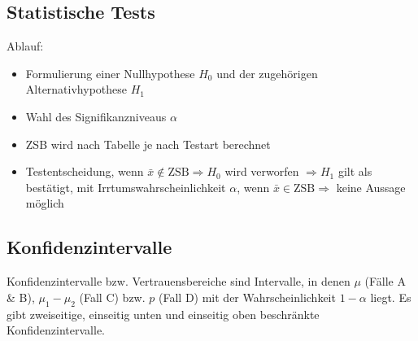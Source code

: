 \subsection{Statistische Tests}
Ablauf:
\begin{itemize}
	\item Formulierung einer Nullhypothese $H_0$ und der zugehörigen Alternativhypothese $H_1$
	\item Wahl des Signifikanzniveaus $\alpha$
	\item ZSB wird nach Tabelle je nach Testart berechnet
	\item Testentscheidung, wenn $\bar{x}\notin\mathrm{ZSB}\Rightarrow H_0$ wird verworfen $\Rightarrow H_1$ gilt als bestätigt, mit Irrtumswahrscheinlichkeit $\alpha$, wenn $\bar{x}\in\mathrm{ZSB}\Rightarrow$ keine Aussage möglich
\end{itemize}

\subsection{Konfidenzintervalle}
Konfidenzintervalle bzw. Vertrauensbereiche sind Intervalle, in denen $\mu$ (Fälle A \& B), $\mu_1-\mu_2$ (Fall C) bzw. $p$ (Fall D) mit der Wahrscheinlichkeit $1-\alpha$ liegt. Es gibt zweiseitige, einseitig unten und einseitig oben beschränkte Konfidenzintervalle.

\clearpage



\clearpage



\clearpage


